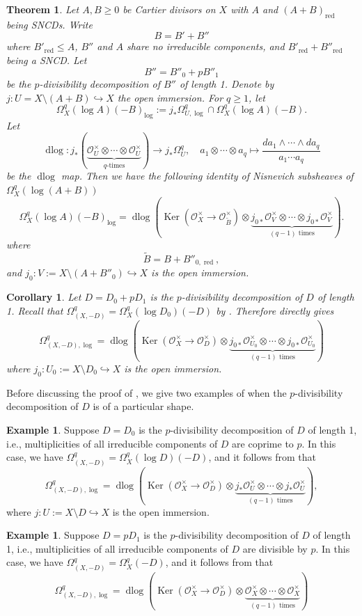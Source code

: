 \documentclass[11pt]{amsart}
\newcommand{\ra}{\rightarrow}
\newcommand{\cO}{\mathcal{O}}
\newcommand{\Ker}{\operatorname{Ker}}
\newcommand{\red}{{\operatorname{red}}}
\newcommand{\dlog}{\operatorname{dlog}}
\newcommand{\hra}{\hookrightarrow}
\renewcommand{\tilde}{\widetilde}
\theoremstyle{plain}
\newtheorem{cor}[prop]{Corollary}
\newtheorem{thm}[prop]{Theorem}
\theoremstyle{definition}
\newtheorem{example}[prop]{Example}
\numberwithin{equation}{prop}
\begin{document}
\begin{thm}
\label{thm1}
Let $A, B\ge 0$ be Cartier divisors on $X$ with $A$ and $(A+B)_\red$ being SNCDs. 
Write $$B=B'+B''$$ 
where 
$B'_\red\le A$, $B''$ and $A$ share no irreducible components, and $B'_\red+B''_\red$ being a SNCD. 
Let $$B''=B''_0+pB''_1$$
be the $p$-divisibility decomposition of $B''$ of length 1. 
Denote by $j:U=X\setminus (A+B)\hra X$ the open immersion.
For $q\ge 1$, let
$$\Omega^q_X(\log A)(-B)_{\log}:=
j_*\Omega^q_{U,\log}\cap \Omega^q_X(\log A)(-B).
$$
Let
$$\dlog:j_*(\underbrace{\cO_{U}^\times \otimes \cdots \otimes \cO_{U}^\times}_{q\text{-times}})
\ra j_*\Omega^q_U,\quad 
a_1\otimes \cdots\otimes a_q\mapsto \frac{da_1\wedge \cdots\wedge da_q}{a_1\cdots a_q}$$
be the $\dlog$ map.
Then 
we have the following identity of Nisnevich subsheaves of $\Omega^q_X(\log (A+B))$
$$\Omega^q_X(\log A)(-B)_{\log}=
\dlog
\left(
\Ker(\cO_X^\times \ra \cO_{\tilde B}^\times)\otimes 
\underbrace{ j_{0*}\cO_{V}^\times\otimes\cdots \otimes  j_{0*}\cO_{V}^\times}_{(q-1)\text{ times}}
\right).$$
where 
$$\tilde B=B+B''_{0,\red},$$
and
$j_0:V:=X\setminus (A+B''_0)\hra X$ is the open immersion.
\end{thm}
\begin{cor}\label{corn=1}
Let $D=D_0+pD_1$ is the $p$-divisibility decomposition of $D$ of length 1.
Recall that $\Omega^q_{(X,-D)}=\Omega^q_X(\log D_0)(-D)$ by \cite[Lemma 8.4]{RamFil1}.
Therefore  directly gives
$$\Omega^q_{(X,-D),\log}=
\dlog\left(
\Ker(\cO_X^\times \ra \cO_{D}^\times)\otimes 
\underbrace{ j_{0*}\cO_{U_0}^\times\otimes\cdots \otimes  j_{0*}\cO_{U_0}^\times}_{(q-1)\text{ times}}
\right)$$
where $j_0:U_0:=X\setminus D_0\hra X$ is the open immersion.
\end{cor}
Before discussing the proof of , we give two examples of  when the $p$-divisibility decomposition of $D$ is of a particular shape.
\begin{example}\label{Ex1}
Suppose $D=D_0$ is the $p$-divisibility decomposition of $D$  of length 1, 
i.e., multiplicities of all irreducible components of $D$ are coprime to $p$.
In this case, we have $\Omega^q_{(X,-D)}=\Omega^q_X(\log D)(-D)$, and it follows from  that
$$\Omega^q_{(X,-D),\log}=
\dlog\left(
\Ker(\cO_X^\times \ra \cO_{D}^\times)\otimes 
\underbrace{ j_{*}\cO_{U}^\times\otimes\cdots \otimes  j_{*}\cO_{U}^\times}_{(q-1)\text{ times}}
\right),$$
where $j:U:=X\setminus D\hra X$ is the open immersion.
\end{example}
\begin{example}\label{Ex2}
Suppose $D=pD_1$ is the $p$-divisibility decomposition of $D$ of length 1, i.e., multiplicities of all irreducible components of $D$ are divisible by $p$.
In this case, we have $\Omega^q_{(X,-D)}=\Omega^q_X(-D)$, and it follows from  that
$$\Omega^q_{(X,-D),\log}=
\dlog\left(
\Ker(\cO_X^\times \ra \cO_{D}^\times)\otimes 
\underbrace{ \cO_{X}^\times\otimes\cdots \otimes  \cO_{X}^\times}_{(q-1)\text{ times}}
\right)$$
\end{example}
\end{document}
